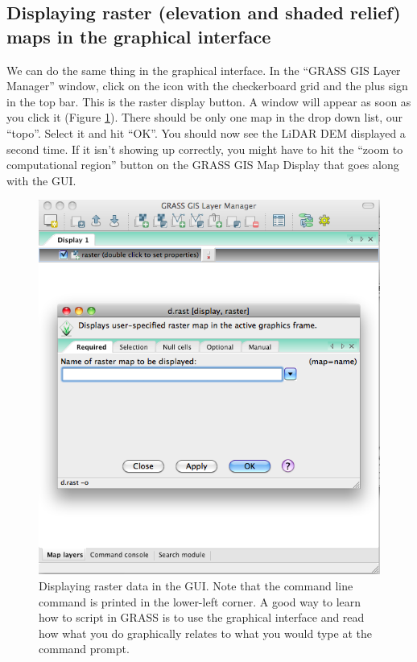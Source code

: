 \documentclass{book}
\begin{document}
\subsection{Displaying raster (elevation and shaded relief) maps in the graphical interface}

We can do the same thing in the graphical interface. In the ``GRASS GIS Layer Manager'' window, click on the icon with the checkerboard grid and the plus sign in the top bar. This is the raster display button. A window will appear as soon as you click it (Figure \ref{fig:display_raster}). There should be only one map in the drop down list, our ``topo''. Select it and hit ``OK''. You should now see the LiDAR DEM displayed a second time. If it isn't showing up correctly, you might have to hit the ``zoom to computational region'' button on the GRASS GIS Map Display that goes along with the GUI.

\begin{figure}
 \begin{center}
 \includegraphics[width=.9\linewidth]{figures/mac/display_raster.png}
 \caption{Displaying raster data in the GUI. Note that the command line command is printed in the lower-left corner. A good way to learn how to script in GRASS is to use the graphical interface and read how what you do graphically relates to what you would type at the command prompt.}
 \label{fig:display_raster}
 \end{center}
\end{figure}
\end{document}
